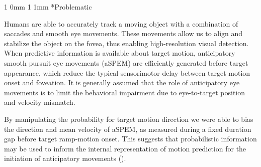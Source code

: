 \documentclass[profile,final,english, draft]{sciposter}%
\title{\Title}%
\author{\AuthorA, \AuthorB,  \AuthorC,  \AuthorD}%
\institute{\Address}%
\makeatletter
\renewcommand{\section}{\@startsection
        {section}%
        {1}%
        {0mm}%
        {1\baselineskip}%
        {1mm}%
        {\LARGE\color{red}\bfseries}}%
\makeatother
\begin{document}
%
\maketitle%
\begin{multicols}{3}



\section*{Problematic}

Humans are able to accurately track a moving object with a combination of saccades and smooth eye movements. These movements allow us to align and stabilize the object on the fovea, thus enabling high-resolution visual detection. When predictive information is available about target motion, anticipatory smooth pursuit eye movements (aSPEM) are efficiently generated before target appearance, which reduce the typical sensorimotor delay between target motion onset and foveation. It is generally assumed that the role of anticipatory eye movements is to limit the behavioral impairment due to eye-to-target position and velocity mismatch.

By manipulating the probability for target motion direction we were able to bias the direction and mean velocity of aSPEM, as measured during a fixed duration gap before target ramp-motion onset. This suggests that probabilistic information may be used to inform the internal representation of motion prediction for the initiation of anticipatory movements (\textcite{Montagnini2010}).





\end{multicols}
\end{document}
